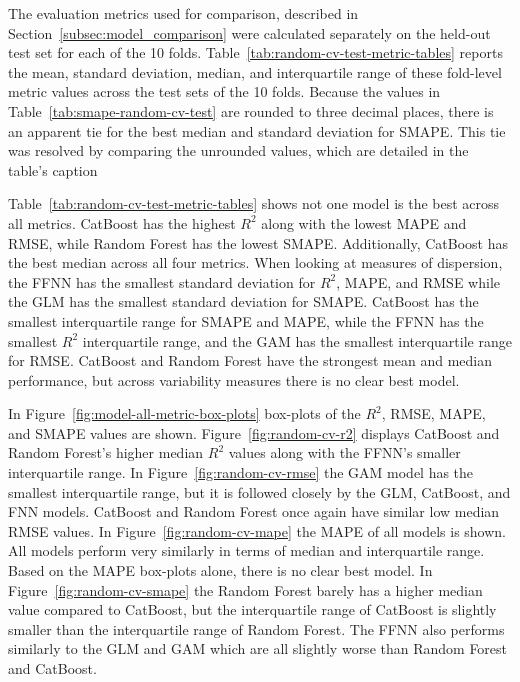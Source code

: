 The evaluation metrics used for comparison, described in Section~\ref{subsec:model_comparison} were calculated separately on the held-out test set for each of the 10 folds. Table~\ref{tab:random-cv-test-metric-tables} reports the mean, standard deviation, median, and interquartile range of these fold-level metric values across the test sets of the 10 folds. Because the values in Table~\ref{tab:smape-random-cv-test} are rounded to three decimal places, there is an apparent tie for the best median and standard deviation for SMAPE. This tie was resolved by comparing the unrounded values, which are detailed in the table's caption

Table~\ref{tab:random-cv-test-metric-tables} shows not one model is the best across all metrics. CatBoost has the highest \(R^2\) along with the lowest MAPE and RMSE, while Random Forest has the lowest SMAPE. Additionally, CatBoost has the best median across all four metrics. When looking at measures of dispersion, the FFNN has the smallest standard deviation for \(R^2\), MAPE, and RMSE while the GLM has the smallest standard deviation for SMAPE. CatBoost has the smallest interquartile range for SMAPE and MAPE, while the FFNN has the smallest \(R^2\) interquartile range, and the GAM has the smallest interquartile range for RMSE. CatBoost and Random Forest have the strongest mean and median performance, but across variability measures there is no clear best model.

In Figure~\ref{fig:model-all-metric-box-plots} box-plots of the \(R^2\), RMSE, MAPE, and SMAPE values are shown. Figure~\ref{fig:random-cv-r2} displays CatBoost and Random Forest's higher median \(R^2\) values along with the FFNN's smaller interquartile range. In Figure~\ref{fig:random-cv-rmse} the GAM model has the smallest interquartile range, but it is followed closely by the GLM, CatBoost, and FNN models. CatBoost and Random Forest once again have similar low median RMSE values. In Figure~\ref{fig:random-cv-mape} the MAPE of all models is shown. All models perform very similarly in terms of  median and interquartile range. Based on the MAPE box-plots alone, there is no clear best model. In Figure~\ref{fig:random-cv-smape} the Random Forest barely has a higher median value compared to CatBoost, but the interquartile range of CatBoost is slightly smaller than the interquartile range of Random Forest. The FFNN also performs similarly to the GLM and GAM which are all slightly worse than Random Forest and CatBoost.

